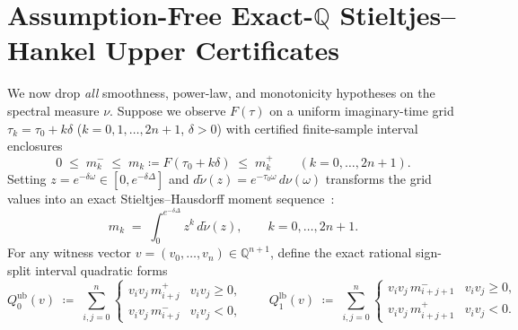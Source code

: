 \documentclass[11pt,a4paper]{article}
\theoremstyle{definition}
\newcommand{\Q}{\mathbb{Q}}
\begin{document}
\section{Assumption-Free Exact-\texorpdfstring{$\Q$}{Q} Stieltjes--Hankel Upper Certificates}
\label{sec:hankel}

We now drop \emph{all} smoothness, power-law, and monotonicity hypotheses on the spectral measure $\nu$. Suppose we observe $F(\tau)$ on a uniform imaginary-time grid $\tau_k = \tau_0 + k\delta$ ($k = 0, 1, \dots, 2n + 1$, $\delta > 0$) with certified finite-sample interval enclosures
\begin{equation}
  0 \;\le\; m_k^- \;\le\; m_k \coloneqq F(\tau_0 + k\delta) \;\le\; m_k^+
  \qquad (k = 0, \dots, 2n + 1).
  \label{eq:moment_box}
\end{equation}
Setting $z = e^{-\delta \omega} \in [0, e^{-\delta \Delta}]$ and $d\tilde{\nu}(z) = e^{-\tau_0 \omega}\, d\nu(\omega)$ transforms the grid values into an exact Stieltjes--Hausdorff moment sequence~\cite{Akhiezer1965Classical,Schmudgen2017Moment}:
\[
  m_k \;=\; \int_0^{e^{-\delta\Delta}} z^k\, d\tilde{\nu}(z), \qquad k = 0, \dots, 2n + 1.
\]
For any witness vector $v = (v_0,\dots,v_n) \in \Q^{n+1}$, define the exact rational sign-split interval quadratic forms
\begin{equation}
  Q_0^{\mathrm{ub}}(v) \;\coloneqq\; \sum_{i,j=0}^n \begin{cases} v_i v_j\, m_{i+j}^+ & v_i v_j \ge 0, \\ v_i v_j\, m_{i+j}^- & v_i v_j < 0, \end{cases}
  \qquad
  Q_1^{\mathrm{lb}}(v) \;\coloneqq\; \sum_{i,j=0}^n \begin{cases} v_i v_j\, m_{i+j+1}^- & v_i v_j \ge 0, \\ v_i v_j\, m_{i+j+1}^+ & v_i v_j < 0. \end{cases}
  \label{eq:sign_split}
\end{equation}
\end{document}
